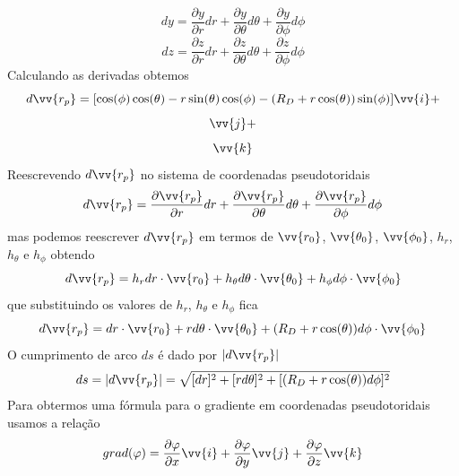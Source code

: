 \documentclass[12pt,oneside,a4paper]{abntex2}
\begin{document}
\begin{equation}
dy = \dfrac{\partial y}{\partial r} dr + \dfrac{\partial y}{\partial \theta} d\theta + \dfrac{\partial y}{\partial \phi} d\phi
\end{equation}
\begin{equation}
dz = \dfrac{\partial z}{\partial r} dr + \dfrac{\partial z}{\partial \theta} d\theta + \dfrac{\partial z}{\partial \phi} d\phi
\end{equation}
Calculando as derivadas obtemos
\begin{equation}
d\vv{r_p} = [\cos(\phi) \cos(\theta) - r \sin(\theta) \cos(\phi) -(R_D + r \cos(\theta))\sin(\phi) ]\vv{i} + 
\end{equation}
\begin{equation*}
[\sin(\phi) \cos(\theta) - r \sin(\theta) \sin(\phi) +(R_D + r \cos(\theta))\cos(\phi) ]\vv{j} + 
\end{equation*}
\begin{equation*}
[\sin(\theta)+r \cos(\theta)]\vv{k}
\end{equation*}
Reescrevendo $d\vv{r_p}$ no sistema de coordenadas pseudotoridais
\begin{equation}
d\vv{r_p} = \dfrac{\partial \vv{r_p}}{\partial r} dr + \dfrac{\partial \vv{r_p}}{\partial \theta} d\theta + \dfrac{\partial \vv{r_p}}{\partial \phi} d\phi
\end{equation}
mas podemos reescrever $d\vv{r_p}$ em termos de $\vv{r_0}$, $\vv{\theta_0}$, $\vv{\phi_0}$, $h_r$, $h_\theta$ e $h_\phi$ obtendo
\begin{equation}
d\vv{r_p} = h_r dr \cdot \vv{r_0}+  h_\theta d\theta \cdot \vv{\theta_0}+h_\phi d\phi \cdot \vv{\phi_0}
\end{equation}
que substituindo os valores de $h_r$, $h_\theta$ e $h_\phi$ fica 
\begin{equation}
d\vv{r_p} = dr \cdot \vv{r_0}+  r d\theta \cdot \vv{\theta_0}+(R_D+r \cos(\theta)) d\phi \cdot \vv{\phi_0}
\end{equation}
O cumprimento de arco $ds$ é dado por $|d\vv{r_p}|$
\begin{equation}
ds=|d\vv{r_p}| = \sqrt{[dr]^2+  [r d\theta ]^2+[(R_D+r \cos(\theta)) d\phi ]^2}
\end{equation}
Para obtermos uma fórmula para o gradiente em coordenadas pseudotoridais usamos a relação 
\begin{equation}
grad (\varphi) = \dfrac{\partial \varphi}{\partial x} \vv{i}+ \dfrac{\partial \varphi}{\partial y} \vv{j}+\dfrac{\partial \varphi}{\partial z} \vv{k}
\end{equation}
\end{document}
